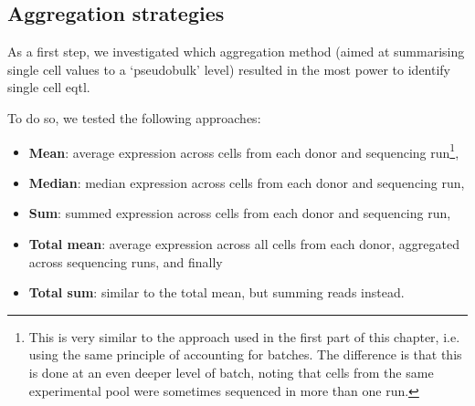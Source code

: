 




\newpage

\subsection{Aggregation strategies}


As a first step, we investigated which aggregation method (aimed at summarising single cell values to a `pseudobulk' level) resulted in the most power to identify single cell \gls{eqtl}.

To do so, we tested the following approaches:

\begin{itemize}
    \item \textbf{Mean}: average expression across cells from each donor and sequencing run\footnote{This is very similar to the approach used in the first part of this chapter, i.e. using the same principle of accounting for batches.
    The difference is that this is done at an even deeper level of batch, noting that cells from the same experimental pool were sometimes sequenced in more than one run.},
    \item \textbf{Median}: median expression across cells from each donor and sequencing run,
    \item \textbf{Sum}: summed expression across cells from each donor and sequencing run,
    \item \textbf{Total mean}: average expression across all cells from each donor, aggregated across sequencing runs, and finally
    \item \textbf{Total sum}: similar to the total mean, but summing reads instead.
\end{itemize}

